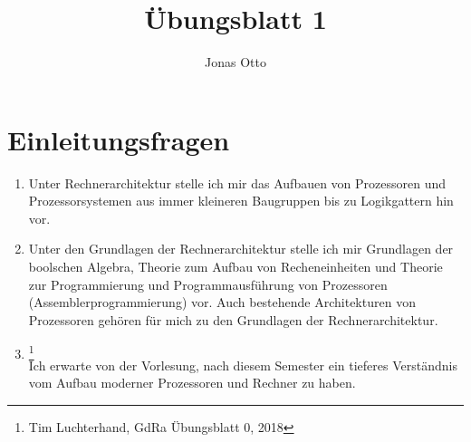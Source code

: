 \documentclass[a4paper]{article}
\author{Jonas Otto}
\title{Übungsblatt 1}
\begin{document}
\maketitle

\section{Einleitungsfragen}
\begin{enumerate}[label=\alph*)]
    \item Unter Rechnerarchitektur stelle ich mir das Aufbauen von Prozessoren und
        Prozessorsystemen aus immer kleineren Baugruppen bis zu Logikgattern hin vor.

    \item Unter den Grundlagen der Rechnerarchitektur stelle ich mir Grundlagen der boolschen
        Algebra, Theorie zum Aufbau von Recheneinheiten und Theorie zur Programmierung und
        Programmausführung von Prozessoren (Assemblerprogrammierung) vor. Auch bestehende 
        Architekturen von Prozessoren gehören für mich zu den Grundlagen der Rechnerarchitektur.

    \item {}\footnote{Tim Luchterhand, GdRa Übungsblatt 0, 2018}\\
        Ich erwarte von der Vorlesung, nach diesem Semester ein tieferes Verständnis vom
        Aufbau moderner Prozessoren und Rechner zu haben. 

\end{enumerate}
\end{document}
